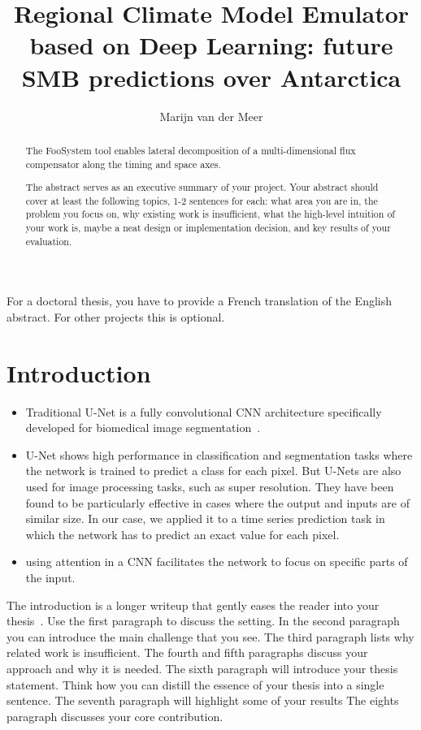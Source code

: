 \documentclass[a4paper,11pt,oneside]{report}
\title{Regional Climate Model Emulator based on Deep Learning: future SMB predictions over Antarctica}
\author{Marijn van der Meer}
\newcommand{\sysname}{FooSystem\xspace}
\begin{document}
\maketitle
\makededication
\makeacks

\begin{abstract}
The \sysname tool enables lateral decomposition of a multi-dimensional
flux compensator along the timing and space axes.

The abstract serves as an executive summary of your project.
Your abstract should cover at least the following topics, 1-2 sentences for
each: what area you are in, the problem you focus on, why existing work is
insufficient, what the high-level intuition of your work is, maybe a neat
design or implementation decision, and key results of your evaluation.
\end{abstract}

\begin{frenchabstract}
For a doctoral thesis, you have to provide a French translation of the
English abstract. For other projects this is optional.
\end{frenchabstract}

\maketoc

\chapter{Introduction}

\begin{itemize}
    \item Traditional U-Net is a fully convolutional CNN architecture specifically developed for biomedical image segmentation~\cite{Ronneberger2015}.  
        \item U-Net shows high performance in classification and segmentation tasks where the network is trained to predict a class for each pixel. But U-Nets are also used for image processing tasks, such as super resolution. They have been found to be particularly effective in cases where the output and inputs are of similar size. In our case, we applied it to a time series prediction task in which the network has to predict an exact value for each pixel.
    \item using attention in a CNN facilitates the network to focus on specific parts of the input. 
\end{itemize}



The introduction is a longer writeup that gently eases the reader into your
thesis~\cite{dinesh20oakland}. Use the first paragraph to discuss the setting.
In the second paragraph you can introduce the main challenge that you see.
The third paragraph lists why related work is insufficient.
The fourth and fifth paragraphs discuss your approach and why it is needed.
The sixth paragraph will introduce your thesis statement. Think how you can
distill the essence of your thesis into a single sentence.
The seventh paragraph will highlight some of your results
The eights paragraph discusses your core contribution.
\end{document}
